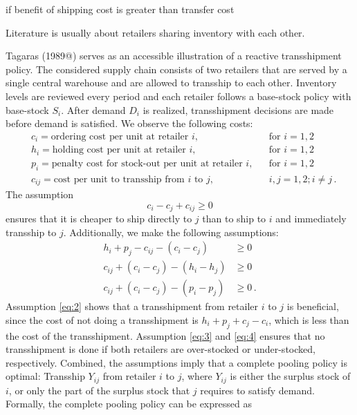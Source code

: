 \documentclass[../../main.tex]{subfiles}
\begin{document}
if benefit of shipping cost is greater than transfer cost

Literature is usually about retailers sharing inventory with each other. 

Tagaras (1989@) serves as an accessible illustration of a reactive transshipment policy. The considered supply chain consists of two retailers that are served by a single central warehouse and are allowed to transship to each other. Inventory levels are reviewed every period and each retailer follows a base-stock policy with base-stock \(S_i\). After demand $D_i$ is realized, transshipment decisions are made before demand is satisfied. We observe the following costs:
%
\begin{align*}
    &c_i = \text{ordering cost per unit at retailer $i$}, && \text{for $i = 1,2$}  \\ 
    &h_i = \text{holding cost per unit at retailer $i$}, && \text{for $i = 1,2$}  \\ 
    &p_i = \text{penalty cost for stock-out per unit at retailer $i$}, && \text{for $i = 1,2$}  \\ 
    &c_{ij} = \text{cost per unit to transship from $i$ to $j$}, && \text{$i,j = 1,2; i \neq j\,$.}
\end{align*}
%
The assumption
%
\begin{equation}
    c_i - c_j + c_{ij} \geq 0\label{eq:1}
\end{equation}
%
ensures that it is cheaper to ship directly to \(j\) than to ship to \(i\) and immediately transship to \(j\). Additionally, we make the following assumptions: 
%
\begin{align}
    h_i + p_j - c_{ij} - (c_i - c_j) &\geq 0\label{eq:2} \\
    c_{ij} + (c_i - c_j) - (h_i - h_j) &\geq 0\label{eq:3} \\
    c_{ij} + (c_i - c_j) - (p_i - p_j) &\geq 0\label{eq:4}\,.
\end{align}
%
Assumption \eqref{eq:2} shows that a transshipment from retailer \(i\) to \(j\) is beneficial, since the cost of not doing a transshipment is $h_i + p_j + c_j - c_i$, which is less than the cost of the transshipment. Assumption \eqref{eq:3} and \eqref{eq:4} ensures that no transshipment is done if both retailers are over-stocked or under-stocked, respectively. Combined, the assumptions imply that a complete pooling policy is optimal: Transship $Y_{ij}$ from retailer $i$ to $j$, where $Y_{ij}$ is either the surplus stock of $i$, or only the part of the surplus stock that $j$ requires to satisfy demand. Formally, the complete pooling policy can be expressed as
\end{document}
